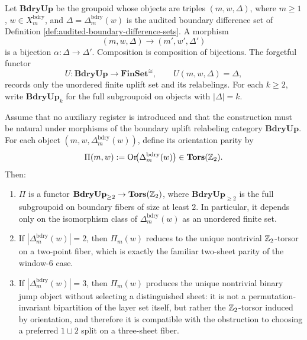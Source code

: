 \begin{definition}\label{def:boundary-uplift-relabeling-category}
Let \(\mathbf{BdryUp}\) be the groupoid whose objects are triples \((m,w,\Delta)\), where \(m\ge1\), \(w\in X_m^{\mathrm{bdry}}\), and \(\Delta=\Delta_m^{\mathrm{bdry}}(w)\) is the audited boundary difference set of Definition \ref{def:audited-boundary-difference-sets}.  A morphism
\[
(m,w,\Delta)\longrightarrow (m',w',\Delta')
\]
is a bijection \(\alpha:\Delta\to\Delta'\).  Composition is composition of bijections.  The forgetful functor
\[
U:\mathbf{BdryUp}\longrightarrow \mathbf{FinSet}^{\cong},
\qquad
U(m,w,\Delta)=\Delta,
\]
records only the unordered finite uplift set and its relabelings.  For each \(k\ge2\), write \(\mathbf{BdryUp}_k\) for the full subgroupoid on objects with \(|\Delta|=k\).
\end{definition}

\begin{corollary}\label{cor:bdry-uplift-orientation-parity}
Assume that no auxiliary register is introduced and that the construction must be natural under morphisms of the boundary uplift relabeling category \(\mathbf{BdryUp}\).
For each object \((m,w,\Delta_m^{\mathrm{bdry}}(w))\), define its orientation parity by
\[
\Pi(m,w):=\mathrm{Or}\!\bigl(\Delta_m^{\mathrm{bdry}}(w)\bigr)\in \mathbf{Tors}(\mathbb{Z}_2).
\]
Then:
\begin{enumerate}
  \item \(\Pi\) is a functor \(\mathbf{BdryUp}_{\ge2}\to\mathbf{Tors}(\mathbb{Z}_2)\), where \(\mathbf{BdryUp}_{\ge2}\) is the full subgroupoid on boundary fibers of size at least \(2\).  In particular, it depends only on the isomorphism class of \(\Delta_m^{\mathrm{bdry}}(w)\) as an unordered finite set.
  \item If \(|\Delta_m^{\mathrm{bdry}}(w)|=2\), then \(\Pi_m(w)\) reduces to the unique nontrivial \(\mathbb{Z}_2\)-torsor on a two-point fiber, which is exactly the familiar two-sheet parity of the window-\(6\) case.
  \item If \(|\Delta_m^{\mathrm{bdry}}(w)|=3\), then \(\Pi_m(w)\) produces the unique nontrivial binary jump object without selecting a distinguished sheet: it is not a permutation-invariant bipartition of the layer set itself, but rather the \(\mathbb{Z}_2\)-torsor induced by orientation, and therefore it is compatible with the obstruction to choosing a preferred \(1\sqcup 2\) split on a three-sheet fiber.
\end{enumerate}
\end{corollary}


